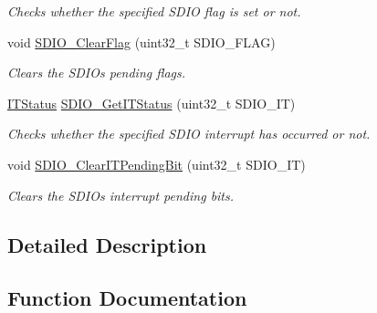 \begin{DoxyCompactItemize}
\begin{DoxyCompactList}\small\item\em Checks whether the specified S\+D\+IO flag is set or not. \end{DoxyCompactList}\item 
void \hyperlink{group___s_d_i_o___exported___functions_ga7aff4efdeb528229135f9f285e53518a}{S\+D\+I\+O\+\_\+\+Clear\+Flag} (uint32\+\_\+t S\+D\+I\+O\+\_\+\+F\+L\+AG)
\begin{DoxyCompactList}\small\item\em Clears the S\+D\+IO\textquotesingle{}s pending flags. \end{DoxyCompactList}\item 
\hyperlink{group___exported__types_gaacbd7ed539db0aacd973a0f6eca34074}{I\+T\+Status} \hyperlink{group___s_d_i_o___exported___functions_ga2d64af1f3df0f99cb518f9a89bbd02ac}{S\+D\+I\+O\+\_\+\+Get\+I\+T\+Status} (uint32\+\_\+t S\+D\+I\+O\+\_\+\+IT)
\begin{DoxyCompactList}\small\item\em Checks whether the specified S\+D\+IO interrupt has occurred or not. \end{DoxyCompactList}\item 
void \hyperlink{group___s_d_i_o___exported___functions_ga048e07fd86321cd01b2a22c071c3149b}{S\+D\+I\+O\+\_\+\+Clear\+I\+T\+Pending\+Bit} (uint32\+\_\+t S\+D\+I\+O\+\_\+\+IT)
\begin{DoxyCompactList}\small\item\em Clears the S\+D\+IO\textquotesingle{}s interrupt pending bits. \end{DoxyCompactList}\end{DoxyCompactItemize}


\subsection{Detailed Description}


\subsection{Function Documentation}
\mbox{\label{group___s_d_i_o___exported___functions_gab44b8cbc21be000a291563076159503b}} 
